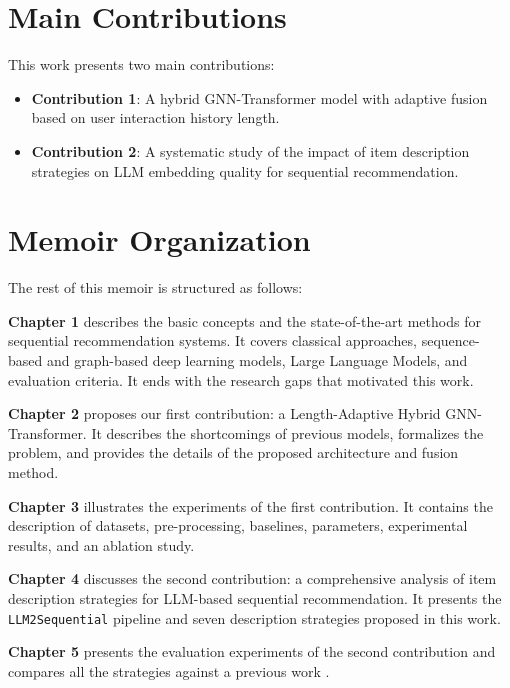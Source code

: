 \documentclass[12pt,a4paper]{report}
\begin{document}
\section*{Main Contributions}

This work presents two main contributions:

\begin{itemize}
  \item \textbf{Contribution 1}: A hybrid GNN-Transformer model with adaptive
  fusion based on user interaction history length.
  \item \textbf{Contribution 2}: A systematic study of the impact of item
  description strategies on LLM embedding quality for sequential
  recommendation.
\end{itemize}

\section*{Memoir Organization}

The rest of this memoir is structured as follows:

\medskip
\textbf{Chapter 1} describes the basic concepts and the state-of-the-art
methods for sequential recommendation systems. It covers classical approaches,
sequence-based and graph-based deep learning models, Large Language Models, and
evaluation criteria. It ends with the research gaps that motivated this work.

\textbf{Chapter 2} proposes our first contribution: a Length-Adaptive Hybrid
GNN-Transformer. It describes the shortcomings of previous models, formalizes
the problem, and provides the details of the proposed architecture and fusion
method.

\textbf{Chapter 3} illustrates the experiments of the first contribution. It
contains the description of datasets, pre-processing, baselines, parameters,
experimental results, and an ablation study.

\textbf{Chapter 4} discusses the second contribution: a comprehensive analysis
of item description strategies for LLM-based sequential recommendation. It
presents the \texttt{LLM2Sequential} pipeline and seven description strategies
proposed in this work.

\textbf{Chapter 5} presents the evaluation experiments of the second
contribution and compares all the strategies against a previous work
\citep{boz2025}.
\end{document}
